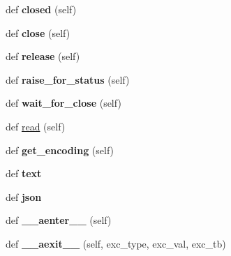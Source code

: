 \begin{DoxyCompactItemize}
def {\bfseries closed} (self)
\item 
\mbox{\label{classaiohttp_1_1client__reqrep_1_1_client_response_a81d418a5fbeb6dc5a5ed86c1b8d0183c}} 
def {\bfseries close} (self)
\item 
\mbox{\label{classaiohttp_1_1client__reqrep_1_1_client_response_ab2dc369726e314c1cd3bad86ec47374b}} 
def {\bfseries release} (self)
\item 
\mbox{\label{classaiohttp_1_1client__reqrep_1_1_client_response_ac11eb3b012d21a22352daaab62859740}} 
def {\bfseries raise\+\_\+for\+\_\+status} (self)
\item 
\mbox{\label{classaiohttp_1_1client__reqrep_1_1_client_response_af0ce3ede3f948906f14d4687667e6ba0}} 
def {\bfseries wait\+\_\+for\+\_\+close} (self)
\item 
def \hyperlink{classaiohttp_1_1client__reqrep_1_1_client_response_aba6fd4155f2908c5d79add128025ea48}{read} (self)
\item 
\mbox{\label{classaiohttp_1_1client__reqrep_1_1_client_response_a5dadd0a7f088ad554587d3df634eea51}} 
def {\bfseries get\+\_\+encoding} (self)
\item 
\mbox{\label{classaiohttp_1_1client__reqrep_1_1_client_response_a98eb6920a2f1c2d30fc2ebfac0f49b48}} 
def {\bfseries text}
\item 
\mbox{\label{classaiohttp_1_1client__reqrep_1_1_client_response_a60aff917f6d6fac38108aaf50a08f9d0}} 
def {\bfseries json}
\item 
\mbox{\label{classaiohttp_1_1client__reqrep_1_1_client_response_a2246f251bf998591d3ff33ac4733033b}} 
def {\bfseries \+\_\+\+\_\+aenter\+\_\+\+\_\+} (self)
\item 
\mbox{\label{classaiohttp_1_1client__reqrep_1_1_client_response_a212ea15f0a10bb26bcc3788cbab41a99}} 
def {\bfseries \+\_\+\+\_\+aexit\+\_\+\+\_\+} (self, exc\+\_\+type, exc\+\_\+val, exc\+\_\+tb)
\end{DoxyCompactItemize}
